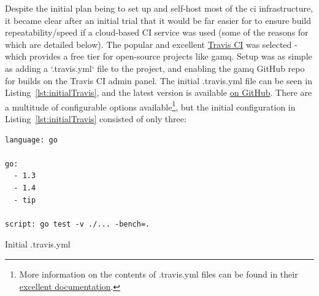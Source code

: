 Despite the initial plan being to set up and self-host most of the \gls{ci}
infrastructure, it became clear after an initial trial that it would be far
easier for to ensure build repeatability/speed if a cloud-based CI service was
used (some of the reasons for which are detailed below). The popular and
excellent \href{https://travis-ci.org/}{Travis CI} was selected - which provides
a free tier for open-source projects like gamq. Setup was as simple as adding a
`.travis.yml` file to the project, and enabling the gamq GitHub repo for builds
on the Travis CI admin panel. The initial .travis.yml file can be seen in
Listing~\ref{lst:initialTravis}, and the latest version is available
\href{https://github.com/FireEater64/gamq/blob/master/.travis.yml}{on GitHub}.
There are a multitude of configurable options available\footnote{More
information on the contents of .travis.yml files can be found in their
\href{https://docs.travis-ci.com/}{excellent documentation}.}, but the initial
configuration in Listing~\ref{lst:initialTravis} consisted of only three:

\begin{listing}
  \centering
  \begin{verbatim}
language: go

go:
  - 1.3
  - 1.4
  - tip

script: go test -v ./... -bench=.
  \end{verbatim}
  \caption{Initial .travis.yml}
  \label{lst:initialTravis}
\end{listing}

